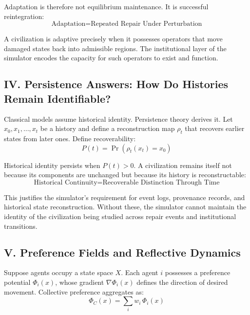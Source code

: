 \documentclass[12pt]{article}
\begin{document}
Adaptation is therefore not equilibrium maintenance. It is successful reintegration:
\begin{equation}
  \boxed{\text{Adaptation} = \text{Repeated Repair Under Perturbation}}
\end{equation}

A civilization is adaptive precisely when it possesses operators that move damaged states back into admissible regions. The institutional layer of the simulator encodes the capacity for such operators to exist and function.

\subsection{IV. Persistence Answers: How Do Histories Remain Identifiable?}

Classical models assume historical identity. Persistence theory derives it. Let $x_0, x_1, \ldots, x_t$ be a history and define a reconstruction map $\rho_t$ that recovers earlier states from later ones. Define recoverability:
\begin{equation}
  P(t) = \Pr\!\left(\rho_t(x_t) = x_0\right)
\end{equation}

Historical identity persists when $P(t) > 0$. A civilization remains itself not because its components are unchanged but because its history is reconstructable:
\begin{equation}
  \boxed{\text{Historical Continuity} = \text{Recoverable Distinction Through Time}}
\end{equation}

This justifies the simulator's requirement for event logs, provenance records, and historical state reconstruction. Without these, the simulator cannot maintain the identity of the civilization being studied across repair events and institutional transitions.

\subsection{V. Preference Fields and Reflective Dynamics}

Suppose agents occupy a state space $X$. Each agent $i$ possesses a preference potential $\Phi_i(x)$, whose gradient $\nabla \Phi_i(x)$ defines the direction of desired movement. Collective preference aggregates as:
\begin{equation}
  \Phi_C(x) = \sum_i w_i \, \Phi_i(x)
\end{equation}
\end{document}
